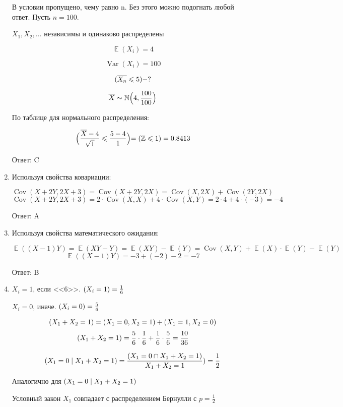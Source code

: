 \documentclass[a4paper]{article} %
\DeclareMathOperator{\Var}{Var}
\DeclareMathOperator{\Cov}{Cov}
\DeclareMathOperator{\E}{\mathbb{E}}
\let\P\relax
\DeclareMathOperator{\P}{\mathbb{P}}
\newcommand \N{\mathbb{N}}
\newcommand \Z{\mathbb{Z}}
\renewcommand{\leq}{\leqslant}
\begin{document}
\begin{enumerate}
    В условии пропущено, чему равно n. Без этого можно подогнать любой ответ. Пусть $n = 100$.

    $X_{1}, X_{2}, \dots$ независимы и одинаково распределены

    \[\E(X_i) = 4\]

    \[\Var(X_i) = 100\]

    \[\P(\overline{X_n} \leq 5) - ?\]

    \[\overline{X} \sim \N\Bigr(4,\frac{100}{100}\Bigl)\]
    
    По таблице для нормального распределения:

    \[\P\Bigr(\frac{\overline{X} - 4}{\sqrt{1}} \leq \frac{5-4}{1}\Bigl) = \P(\Z\leq 1) = 0.8413\]
    
    Ответ: C

    \item
    
    Используя свойства ковариации:

    \[\Cov(X+2Y, 2X + 3) = \Cov(X+2Y, 2X) = \Cov(X, 2X) + \Cov(2Y, 2X) \]
    \[\Cov(X+2Y, 2X + 3) = 2 \cdot \Cov(X,X) + 4 \cdot \Cov(X,Y) = 2 \cdot 4 + 4 \cdot (-3) = -4\]

    Ответ: A

    \item
    
    Используя свойства математического ожидания:

    \[\E((X-1)Y) = \E(XY - Y) = \E(XY) - \E(Y) = \Cov(X,Y) + \E(X)\cdot\E(Y) -\E(Y)\] 
    \[\E((X-1)Y) = -3 + (-2) - 2 = -7\]

    Ответ: B

    \item

    $X_{i} = 1$, если <<6>>. $\P(X_{i} = 1) = \frac{1}{6}$

    $X_{i} = 0$, иначе. $\P(X_{i} = 0) = \frac{5}{6}$

    \[\P(X_{1} + X_{2} = 1) = \P(X_{1} = 0, X_{2} = 1) + \P(X_{1} = 1, X_{2} = 0) \]
    \[\P(X_{1} + X_{2} = 1) = \frac{5}{6} \cdot \frac{1}{6} + \frac{1}{6} \cdot \frac{5}{6} = \frac{10}{36}\]
    
    \[\P(X_{1} = 0\mid X_{1} + X_{2} = 1) = \frac{\P(X_{1} = 0\cap X_{1} + X_{2} = 1)}{X_{1} + X_{2} = 1}) = \frac{1}{2}\]
    
    Аналогично для $\P(X_{1} = 0\mid X_{1} + X_{2} = 1)$
    
    Условный закон $X_{1}$ совпадает с распределением Бернулли с $p = \frac{1}{2}$
    

\end{enumerate}
\end{document}
